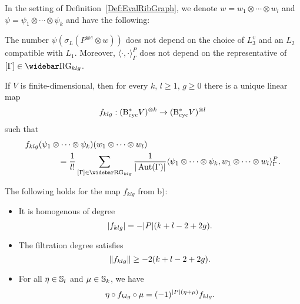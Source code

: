 \documentclass[\MainFolder/Text.tex]{subfiles}
\begin{document}
\begin{Proposition}\label{Prop:GraphPairing}
In the setting of Definition~\ref{Def:EvalRibGraph}, we denote $w = w_1 \otimes \dotsb \otimes w_l$ and $\psi = \psi_1 \otimes \dotsb\otimes \psi_k$ and have the following:
\begin{ClaimList}
\item The number $\psi(\sigma_L(P^{\otimes e}\otimes w))$ does not depend on the choice of $L_{3}^v$ and an $L_2$ compatible with $L_1$. Moreover, $\langle\cdot, \cdot \rangle_\Gamma^P$ does not depend on the representative of $[\Gamma]\in \RRG_{klg}$.
\item If $V$ is finite-dimensional, then for every $k$, $l \ge 1$, $g \ge 0$ there is a unique linear map
$$ f_{klg}: (\mathrm{B}_{\mathrm{cyc}}^* V)^{\otimes k} \rightarrow (\mathrm{B}_{\mathrm{cyc}}^* V)^{\otimes l} $$ such that
\begin{equation*}
\begin{aligned}
&f_{klg}(\psi_1\otimes \dotsb \otimes \psi_k)(w_1 \otimes \dotsb \otimes w_l) \\
 &\qquad\qquad =  \frac{1}{l!} \sum_{[\Gamma]\in \RRG_{klg}} \frac{1}{\Abs{\Aut(\Gamma)}} \langle \psi_1\otimes \dotsb \otimes \psi_k, w_1 \otimes \dotsb \otimes w_l\rangle^P_{\Gamma}. \end{aligned}
\end{equation*}
\item The following holds for the map $f_{klg}$ from b):
\begin{itemize}
\item It is homogenous of degree
\begin{equation} \label{Eq:DegreeForm} |f_{klg}| = -|P|(k+l-2+2g). \end{equation}
\item The filtration degree satisfies
\begin{equation} \label{Eq:FiltrDegreeForm} 
 \| f_{klg} \| \ge - 2 (k+l-2+2g).
\end{equation}
\item For all $\eta\in\mathbb{S}_l$ and $\mu\in\mathbb{S}_k$, we have
\begin{equation} \label{Eq:SymmetryForm} \eta \circ f_{klg} \circ \mu = (-1)^{|P|(\eta + \mu)}f_{klg}.
\end{equation}
\end{itemize}
\end{ClaimList}
\end{Proposition}
\end{document}
